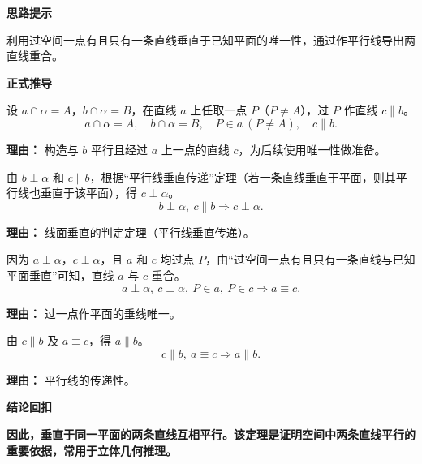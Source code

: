 \begin{proofbox}
	\textbf{\textcolor{CProof}{思路提示}}

	利用过空间一点有且只有一条直线垂直于已知平面的唯一性，通过作平行线导出两直线重合。

	\medskip
	\textbf{\textcolor{CProof}{正式推导}}
	\begin{description}[style=nextline, leftmargin=2.8em, labelsep=0.5em, itemsep=0.55em]
		\item[\textbf{第一步（作平行线）：}]
			设 $a\cap\alpha=A$，$b\cap\alpha=B$，在直线 $a$ 上任取一点 $P$（$P\neq A$），过 $P$ 作直线 $c\parallel b$。
			\[
				a\cap\alpha=A,\quad b\cap\alpha=B,\quad P\in a\ (P\neq A),\quad c\parallel b.
			\]
			\par\textbf{理由：}
			构造与 $b$ 平行且经过 $a$ 上一点的直线 $c$，为后续使用唯一性做准备。

		\item[\textbf{第二步（证$c\perp\alpha$）：}]
			由 $b\perp\alpha$ 和 $c\parallel b$，根据“平行线垂直传递”定理（若一条直线垂直于平面，则其平行线也垂直于该平面），得 $c\perp\alpha$。
			\[
				b\perp\alpha,\ c\parallel b \Rightarrow c\perp\alpha.
			\]
			\par\textbf{理由：}
			线面垂直的判定定理（平行线垂直传递）。

		\item[\textbf{第三步（唯一性导出重合）：}]
			因为 $a\perp\alpha$，$c\perp\alpha$，且 $a$ 和 $c$ 均过点 $P$，由“过空间一点有且只有一条直线与已知平面垂直”可知，直线 $a$ 与 $c$ 重合。
			\[
				a\perp\alpha,\ c\perp\alpha,\ P\in a,\ P\in c\Rightarrow a\equiv c.
			\]
			\par\textbf{理由：}
			过一点作平面的垂线唯一。

		\item[\textbf{第四步（结论）：}]
			由 $c\parallel b$ 及 $a\equiv c$，得 $a\parallel b$。
			\[
				c\parallel b,\ a\equiv c\Rightarrow a\parallel b.
			\]
			\par\textbf{理由：}
			平行线的传递性。
	\end{description}

	\medskip
	\textbf{\textcolor{CProof}{结论回扣}}

	\textbf{因此，垂直于同一平面的两条直线互相平行。该定理是证明空间中两条直线平行的重要依据，常用于立体几何推理。}
\end{proofbox}

